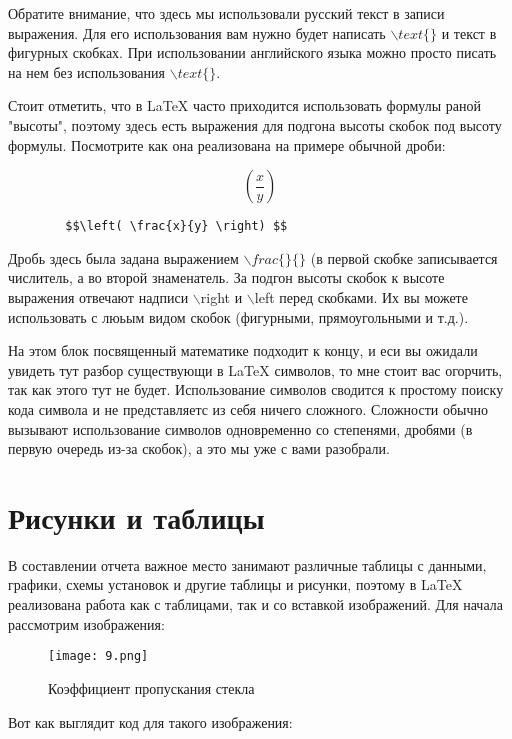     Обратите внимание, что здесь мы использовали русский текст в записи выражения. Для его использования вам нужно будет написать $\backslash text\{\}$ и текст в фигурных скобках. При использовании английского языка можно просто писать на нем без использования $\backslash text\{\}$.
    
    Стоит отметить, что в \LaTeX{} часто приходится использовать формулы раной "высоты", поэтому здесь есть выражения для подгона высоты скобок под высоту формулы. Посмотрите как она реализована на примере обычной дроби:
    
    $$\left( \frac{x}{y} \right) $$
    
    \begin{verbatim}
        $$\left( \frac{x}{y} \right) $$
    \end{verbatim}
    
    Дробь здесь была задана выражением $\backslash frac\{\}\{\}$ (в первой скобке записывается числитель, а во второй знаменатель. За подгон высоты скобок к высоте выражения отвечают надписи $\backslash$right и $\backslash$left перед скобками. Их вы можете использовать с люьым видом скобок (фигурными, прямоугольными и т.д.).
    
    
    
    На этом блок посвященный математике подходит к концу, и еси вы ожидали увидеть тут разбор существующи в \LaTeX{} символов, то мне стоит вас огорчить, так как этого тут не будет. Использование символов сводится к простому поиску кода символа и не представляетс из себя ничего сложного. Сложности обычно вызывают использование символов одновременно со степенями, дробями (в первую очередь из-за скобок), а это мы уже с вами разобрали.
    
    \section{Рисунки и таблицы}

    В составлении отчета важное место занимают различные таблицы с данными, графики, схемы установок и другие таблицы и рисунки, поэтому в \LaTeX{} реализована работа как с таблицами, так и со вставкой изображений. Для начала рассмотрим изображения:
    
    \begin{figure}[h!]
        \centering
        \texttt{[image: 9.png]}
        \caption{Коэффициент пропускания стекла}
    \end{figure}
    
    Вот как выглядит код для такого изображения:
    

